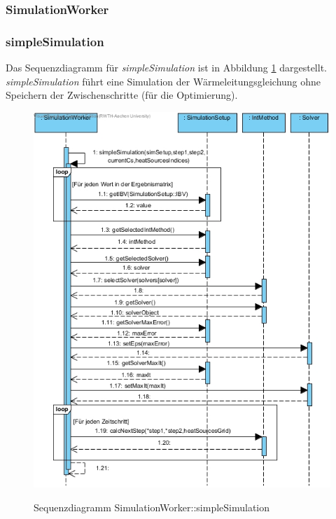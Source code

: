 \subsubsection{SimulationWorker}

\subsubsection*{simpleSimulation}

Das Sequenzdiagramm für \emph{simpleSimulation} ist in Abbildung \ref{Sequenzdiagramm SimulationWorker::simpleSimulation} dargestellt. \emph{simpleSimulation} führt eine Simulation der Wärmeleitungsgleichung ohne Speichern der Zwischenschritte (für die Optimierung).

\begin{figure}[H]
	\centering
	\includegraphics[scale=.85]{Bilder/SimulationWorker__simpleSimulation().jpg}\\
	\caption{Sequenzdiagramm SimulationWorker::simpleSimulation}
	\label{Sequenzdiagramm SimulationWorker::simpleSimulation}
\end{figure}

